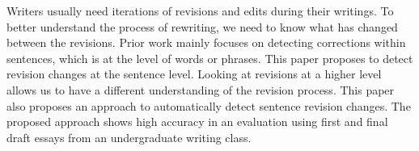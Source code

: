 Writers usually need iterations of revisions and edits during their writings. To better understand the process of rewriting, we need to know what has changed between the revisions. Prior work mainly focuses on detecting corrections within sentences, which is at the level of words or phrases. This paper proposes to detect revision changes at the sentence level. Looking at revisions at a higher level allows us to have a different understanding of the revision process. This paper also proposes an approach to automatically detect sentence revision changes. The proposed approach shows high accuracy in an evaluation using first and final draft essays from an undergraduate writing class.
